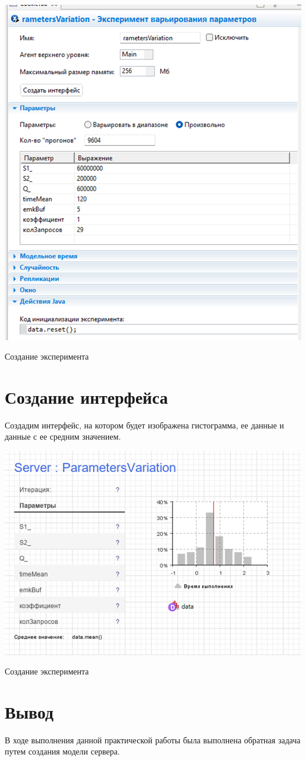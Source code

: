 \begin{image}
	\includegraphics[width=1\textwidth]{img2}
	\caption{Создание эксперимента}
	\label{fig:data}
\end{image}

\clearpage

\section{Создание интерфейса}
Создадим интерфейс, на котором будет изображена гистограмма, ее данные и данные с ее средним значением.

\begin{image}
	\includegraphics[width=1\textwidth]{img3}
	\caption{Создание эксперимента}
	\label{fig:interface}
\end{image}

\clearpage

\section*{Вывод}
В ходе выполнения данной практической работы была выполнена обратная задача путем создания модели сервера.

